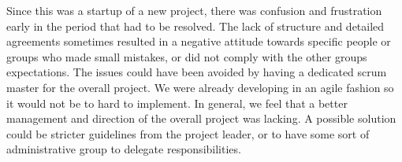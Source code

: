 Since this was a startup of a new project, there was confusion and frustration early in the period that had to be resolved.
The lack of structure and detailed agreements sometimes resulted in a negative attitude towards specific people or groups who made small mistakes, or did not comply with the other groups expectations.
The issues could have been avoided by having a dedicated scrum master for the overall project.
We were already developing in an agile fashion so it would not be to hard to implement.
In general, we feel that a better management and direction of the overall project was lacking.
A possible solution could be stricter guidelines from the project leader, or to have some sort of administrative group to delegate responsibilities.
